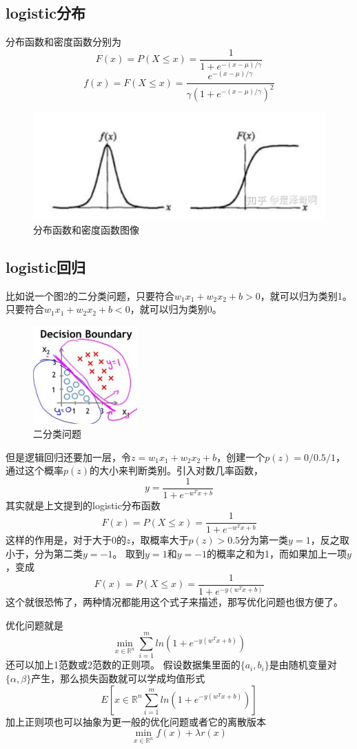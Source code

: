 \documentclass{article}
\begin{document}
\subsection{logistic分布}
分布函数和密度函数分别为
$$F(x)=P(X \le x)=\frac{1}{1+e^{-(x-\mu)/ \gamma}}$$
$$f(x)=F(X \le x)=\frac{e^{-(x-\mu)/ \gamma}}{\gamma (1+e^{-(x-\mu)/ \gamma})^2}$$
\begin{figure}[h]
    \centering
    \includegraphics[width=12cm]{1.png}
    \caption{分布函数和密度函数图像}
\end{figure}
\subsection{logistic回归}
比如说一个图2的二分类问题，只要符合$w_1x_1+w_2x_2+b>0$，就可以归为类别1。只要符合$w_1x_1+w_2x_2+b<0$，就可以归为类别0。
\begin{figure}[h]
    \centering
    \includegraphics[width=4cm]{2.png}
    \caption{二分类问题}
\end{figure}

但是逻辑回归还要加一层，令$z=w_1x_1+w_2x_2+b$，创建一个$p(z)=0/0.5/1$，通过这个概率$p(z)$的大小来判断类别。引入对数几率函数，
$$
y=\frac{1}{1+e^{-w^Tx+b}}
$$
其实就是上文提到的logistic分布函数
$$F(x)=P(X \le x)=\frac{1}{1+e^{-w^Tx+b}}$$
这样的作用是，对于大于0的$z$，取概率大于$p(z)>0.5$分为第一类$y=1$，反之取小于，分为第二类$y=-1$。
取到$y=1$和$y=-1$的概率之和为1，而如果加上一项$y$，变成
$$F(x)=P(X \le x)=\frac{1}{1+e^{-y(w^Tx+b)}}$$
这个就很恐怖了，两种情况都能用这个式子来描述，那写优化问题也很方便了。

优化问题就是
$$\min\limits_{x \in \mathbb{R}^n}\sum\limits_{i=1}^m ln(1+e^{-y(w^Tx+b)})$$
还可以加上1范数或2范数的正则项。
假设数据集里面的$\{a_i,b_i\}$是由随机变量对$\{\alpha,\beta\}$产生，那么损失函数就可以学成均值形式
$$E[{x \in \mathbb{R}^n}\sum\limits_{i=1}^m ln(1+e^{-y(w^Tx+b)})]$$
加上正则项也可以抽象为更一般的优化问题或者它的离散版本
$$\min\limits_{x \in \mathbb{R}^n} f(x)+\lambda r(x)$$
\end{document}
